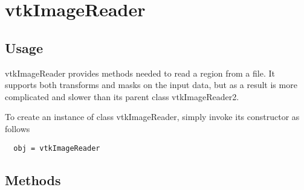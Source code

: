 \section{vtkImageReader}

\subsection{Usage}

 vtkImageReader provides methods needed to read a region from a file.
 It supports both transforms and masks on the input data, but as a result
 is more complicated and slower than its parent class vtkImageReader2.

To create an instance of class vtkImageReader, simply
invoke its constructor as follows
\begin{verbatim}
  obj = vtkImageReader
\end{verbatim}
\subsection{Methods}

